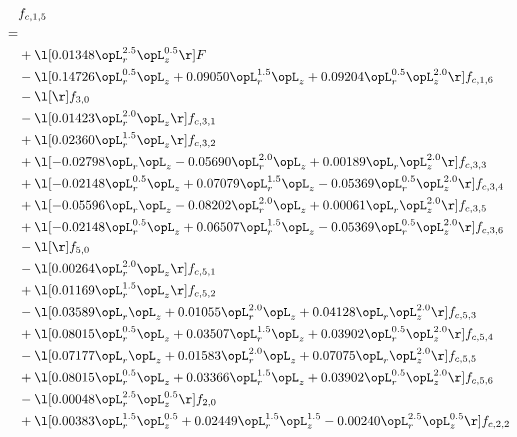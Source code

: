 \begin{alignat}{2} 
\label{eq:f_15_2} 
& f_{c,1,5} \nonumber \\ 
 = \\ 
& + \l[  0.01348 \opL_r^{2.5} \opL_z^{0.5}  \r] F \nonumber \\ 
& - \l[  0.14726 \opL_r^{0.5} \opL_z +  0.09050 \opL_r^{1.5} \opL_z +  0.09204 \opL_r^{0.5} \opL_z^{2.0}  \r] f_{c,1,6} \nonumber \\ 
& - \l[  \r] f_{3,0} \nonumber \\ 
& - \l[  0.01423 \opL_r^{2.0} \opL_z  \r] f_{c,3,1} \nonumber \\ 
& + \l[  0.02360 \opL_r^{1.5} \opL_z  \r] f_{c,3,2} \nonumber \\ 
& + \l[  -0.02798 \opL_r \opL_z   -0.05690 \opL_r^{2.0} \opL_z +  0.00189 \opL_r \opL_z^{2.0}  \r] f_{c,3,3} \nonumber \\ 
& + \l[  -0.02148 \opL_r^{0.5} \opL_z +  0.07079 \opL_r^{1.5} \opL_z   -0.05369 \opL_r^{0.5} \opL_z^{2.0}  \r] f_{c,3,4} \nonumber \\ 
& + \l[  -0.05596 \opL_r \opL_z   -0.08202 \opL_r^{2.0} \opL_z +  0.00061 \opL_r \opL_z^{2.0}  \r] f_{c,3,5} \nonumber \\ 
& + \l[  -0.02148 \opL_r^{0.5} \opL_z +  0.06507 \opL_r^{1.5} \opL_z   -0.05369 \opL_r^{0.5} \opL_z^{2.0}  \r] f_{c,3,6} \nonumber \\ 
& - \l[  \r] f_{5,0} \nonumber \\ 
& - \l[  0.00264 \opL_r^{2.0} \opL_z  \r] f_{c,5,1} \nonumber \\ 
& + \l[  0.01169 \opL_r^{1.5} \opL_z  \r] f_{c,5,2} \nonumber \\ 
& - \l[  0.03589 \opL_r \opL_z +  0.01055 \opL_r^{2.0} \opL_z +  0.04128 \opL_r \opL_z^{2.0}  \r] f_{c,5,3} \nonumber \\ 
& + \l[  0.08015 \opL_r^{0.5} \opL_z +  0.03507 \opL_r^{1.5} \opL_z +  0.03902 \opL_r^{0.5} \opL_z^{2.0}  \r] f_{c,5,4} \nonumber \\ 
& - \l[  0.07177 \opL_r \opL_z +  0.01583 \opL_r^{2.0} \opL_z +  0.07075 \opL_r \opL_z^{2.0}  \r] f_{c,5,5} \nonumber \\ 
& + \l[  0.08015 \opL_r^{0.5} \opL_z +  0.03366 \opL_r^{1.5} \opL_z +  0.03902 \opL_r^{0.5} \opL_z^{2.0}  \r] f_{c,5,6} \nonumber \\ 
& - \l[  0.00048 \opL_r^{2.5} \opL_z^{0.5}  \r] f_{2,0} \nonumber \\ 
& + \l[  0.00383 \opL_r^{1.5} \opL_z^{0.5} +  0.02449 \opL_r^{1.5} \opL_z^{1.5}   -0.00240 \opL_r^{2.5} \opL_z^{0.5}  \r] f_{c,2,2} \nonumber \\ 

\end{alignat}
